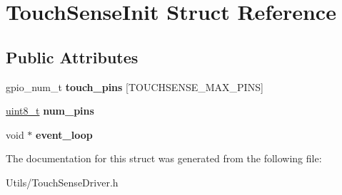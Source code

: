 \hypertarget{structTouchSenseInit}{}\section{Touch\+Sense\+Init Struct Reference}
\label{structTouchSenseInit}
\subsection*{Public Attributes}
\begin{DoxyCompactItemize}
\item 
\mbox{\label{structTouchSenseInit_a319ec86281c796d47b341c8fda47ff62}} 
gpio\+\_\+num\+\_\+t {\bfseries touch\+\_\+pins} \mbox{[}T\+O\+U\+C\+H\+S\+E\+N\+S\+E\+\_\+\+M\+A\+X\+\_\+\+P\+I\+NS\mbox{]}
\item 
\mbox{\label{structTouchSenseInit_ac4be7a6e1d38e3ddf71fa3c4ab7f9666}} 
\hyperlink{vl53l0x__types_8h_aba7bc1797add20fe3efdf37ced1182c5}{uint8\+\_\+t} {\bfseries num\+\_\+pins}
\item 
\mbox{\label{structTouchSenseInit_a1034ab71d367c6838e3adef5d34679b0}} 
void $\ast$ {\bfseries event\+\_\+loop}
\end{DoxyCompactItemize}


The documentation for this struct was generated from the following file\+:\begin{DoxyCompactItemize}
\item 
Utils/Touch\+Sense\+Driver.\+h\end{DoxyCompactItemize}
